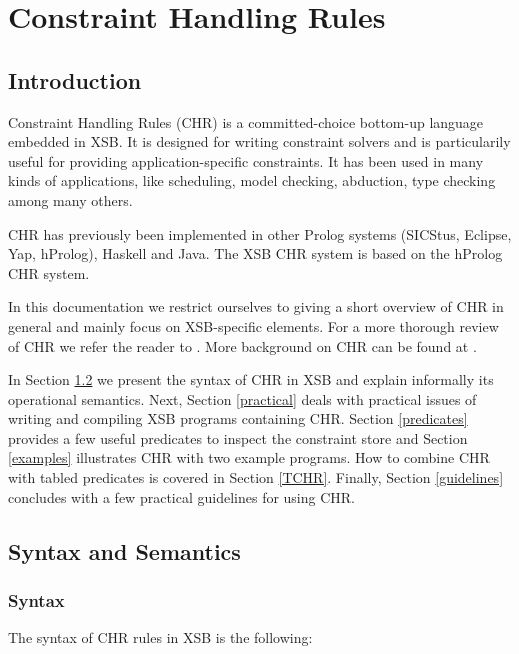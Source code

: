 \chapter{Constraint Handling Rules} \label{chr}

\section{Introduction}

Constraint Handling Rules (CHR) is a committed-choice bottom-up language
embedded in XSB. It is designed for writing constraint solvers and is
particularily useful for providing application-specific constraints.
It has been used in many kinds of applications, like scheduling,
model checking, abduction, type checking among many others.

CHR has previously been implemented in other Prolog systems (SICStus,
Eclipse, Yap, hProlog), Haskell and Java. The XSB CHR system is based on
the hProlog CHR system.

In this documentation we restrict ourselves to giving a short overview of CHR
in general and mainly focus on XSB-specific elements.  For a more thorough
review of CHR we refer the reader to \cite{chr_survey}. More background on
CHR can be found at \cite{chr_site}.

In Section \ref{SyntaxAndSemantics} we present the syntax of CHR in XSB and
explain informally its operational semantics. Next, Section \ref{practical}
deals with practical issues of writing and compiling XSB programs containing
CHR. Section \ref{predicates} provides a few useful predicates to inspect
the constraint store and Section \ref{examples} illustrates CHR with two
example programs. How to combine CHR with tabled predicates is covered in
Section \ref{TCHR}. Finally, Section \ref{guidelines} concludes with a few
practical guidelines for using CHR.


\section{Syntax and Semantics} \label{SyntaxAndSemantics}

\subsection{Syntax}

The syntax of CHR rules in XSB is the following:

